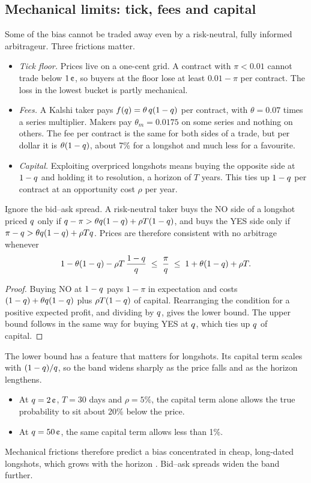 \subsection{Mechanical limits: tick, fees and capital}\label{sec:framework-band}

Some of the bias cannot be traded away even by a risk-neutral, fully informed arbitrageur. Three
frictions matter.
\begin{itemize}
  \item \emph{Tick floor.} Prices live on a one-cent grid. A contract with $\pi<0.01$ cannot trade
  below $1\cents$, so buyers at the floor lose at least $0.01-\pi$ per contract. The loss in the
  lowest bucket is partly mechanical.
  \item \emph{Fees.} A Kalshi taker pays $f(q)=\theta\,q(1-q)$ per contract, with
  $\theta=0.07$ times a series multiplier. Makers pay $\theta_m=0.0175$ on some series and
  nothing on others. The fee per contract is the same for both sides of a trade, but per dollar
  it is $\theta(1-q)$, about 7\% for a longshot and much less for a favourite.
  \item \emph{Capital.} Exploiting overpriced longshots means buying the opposite side at
  $1-q$ and holding it to resolution, a horizon of $T$ years. This ties up $1-q$ per contract
  at an opportunity cost $\rho$ per year.
\end{itemize}

\begin{proposition}\label{prop:band}
Ignore the bid--ask spread. A risk-neutral taker buys the NO side of a longshot priced $q$ only
if $q-\pi>\theta q(1-q)+\rho T(1-q)$, and buys the YES side only if
$\pi-q>\theta q(1-q)+\rho Tq$. Prices are therefore consistent with no arbitrage whenever
\begin{equation}\label{eq:band}
  1-\theta(1-q)-\rho T\,\frac{1-q}{q}\;\le\;\frac{\pi}{q}\;\le\;1+\theta(1-q)+\rho T .
\end{equation}
\end{proposition}
\begin{proof}
Buying NO at $1-q$ pays $1-\pi$ in expectation and costs $(1-q)+\theta q(1-q)$ plus
$\rho T(1-q)$ of capital. Rearranging the condition for a positive expected profit, and dividing
by $q$, gives the lower bound. The upper bound follows in the same way for buying YES at $q$,
which ties up $q$ of capital.
\end{proof}

The lower bound has a feature that matters for longshots. Its capital term scales with
$(1-q)/q$, so the band widens sharply as the price falls and as the horizon lengthens.
\begin{itemize}
  \item At $\q=2\cents$, $T=30$ days and $\rho=5\%$, the capital term alone allows the true
  probability to sit about 20\% below the price.
  \item At $\q=50\cents$, the same capital term allows less than 1\%.
\end{itemize}
Mechanical frictions therefore predict a bias concentrated in cheap, long-dated longshots, which
grows with the horizon \citep{pageclemen2013}. Bid--ask spreads widen the band further.

